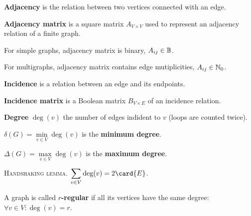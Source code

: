 \documentclass[a4paper,10pt]{article}
\newcommand{\op}[1]{\operatorname*{#1}}
\newcommand{\degree}[1]{\op{deg}(#1)}
\newcommand{\minDegree}[1]{\delta(#1)}
\newcommand{\maxDegree}[1]{\Delta(#1)}
\begin{document}
\begin{terms}
\begin{minipage}{\linewidth}
    \item \textbf{Adjacency} is the relation between two vertices connected with an edge.
    \item \textbf{Adjacency matrix} is a square matrix $A_{V \times V}$ used to represent an adjacency relation of a finite graph.
    \begin{terms}
        \item For simple graphs, adjacency matrix is binary, \ie $A_{ij} \in \mathbb{B}$.
        \item For multigraphs, adjacency matrix contains edge mutiplicities, \ie $A_{ij} \in \mathbb{N}_{0}$.
    \end{terms}
    \item \textbf{Incidence} is a relation between an edge and its endpoints.
    \item \textbf{Incidence matrix} is a Boolean matrix $B_{V \times E}$ of an incidence relation.

    \end{minipage}


    \item \textbf{Degree} $\degree{v}$ the number of edges indident to $v$ (loops are counted twice).
    \begin{terms}
        \item $\minDegree{G} = \min\limits_{v \in V} \degree{v}$ is the \textbf{minimum degree}.
        \item $\maxDegree{G} = \max\limits_{v \in V} \degree{v}$ is the \textbf{maximum degree}.
        \item \textsc{Handshaking lemma}. $\displaystyle \sum_{v \in V} \degree{v} = 2 \card{E}$.
    \end{terms}

    \item A graph is called \textbf{$r$-regular} if all its vertices have the same degree: $\forall v \in V : \degree{v} = r$.

    \begin{minipage}{\linewidth}


\end{minipage}
\end{terms}
\end{document}
